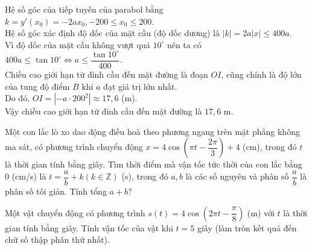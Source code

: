 \begin{ex}
{Hệ số góc của tiếp tuyến của parabol bằng $k=y'(x_0)=-2 a x_0,-200 \leq x_0 \leq 200$.\\
Hệ số góc xác định độ dốc của mặt cầu (độ dốc dương) là $|k|=2 a|x| \leq 400 a$.\\
Vì độ dốc của mặt cầu không vượt quá $10^\circ$ nên ta có
$400 a \leq \tan 10^\circ \Leftrightarrow a \leq \dfrac{\tan 10^\circ}{400}$.\\
Chiều cao giới hạn từ đỉnh cầu đến mặt đường là đoạn $O I$, cũng chính là độ lớn của tung độ điểm $B$ khi $a$ đạt giá trị lớn nhất.\\
Do đó, $O I=\left|-a \cdot 200^2\right|\approx 17{,}6$ (m).\\
Vậy chiều cao giới hạn từ đỉnh cầu đến mặt đường là $17{,}6$ m.
}
\end{ex}

\begin{ex}%
	Một con lắc lò xo dao động điều hoà theo phương ngang trên mặt phẳng không ma sát, có phương trình chuyển động $x=4\cos \left(\pi t-\dfrac{2\pi}{3} \right)+4$ (cm), trong đó $t$ là thời gian tính bằng giây. Tìm thời điểm mà vận tốc tức thời của con lắc bằng $0$ (cm/s) là $t=\dfrac{a}{b}+k(k\in \mathbb{Z})$ (s), trong đó $a,b$ là các số nguyên và phân số $\dfrac{a}{b}$ là phân số tối giản. Tính tổng $a+b$?
\end{ex}

\begin{ex}%
Một vật chuyển động có phương trình $s(t)=4\cos \left(2\pi t-\dfrac{\pi}{8} \right)$ (m) với $t$ là thời gian tính bằng giây. Tính vận tốc của vật khi $t=5$ giây (làm tròn kết quả đến chữ số thập phân thứ nhất).
\end{ex}

